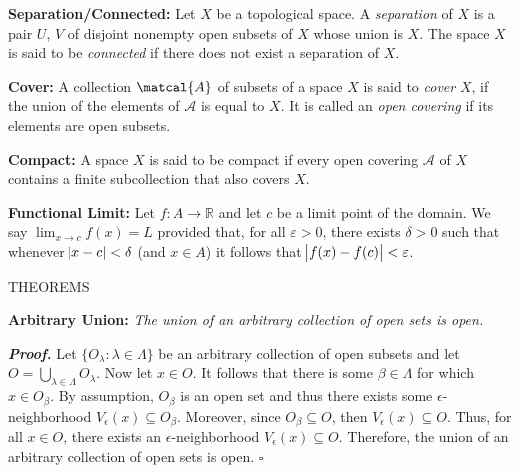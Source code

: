\documentclass[12pt, a4paper]{article}
\begin{document}
\vspace{4mm}\par

\textbf{Separation/Connected:} Let $X$ be a topological space. A \textit{separation} of $X$ is a pair $U$, $V$ of disjoint nonempty open subsets of $X$ whose union is $X$. The space $X$ is said to be \textit{connected} if there does not exist a separation of $X$.

\vspace{4mm}\par

\textbf{Cover:} A collection $\matcal{A}$ of subsets of a space $X$ is said to \textit{cover} $X$, if the union of the elements of $\mathcal{A}$ is equal to $X$. It is called an \textit{open covering} if its elements are open subsets.

\vspace{4mm}\par

\textbf{Compact:} A space $X$ is said to be compact if every open covering $\mathcal{A}$ of $X$ contains a finite subcollection that also covers $X$.

\vspace{4mm}\par

\textbf{Functional Limit:} Let $f\colon A\rightarrow\mathbb{R}$ and let $c$ be a limit point of the domain. We say $\lim_{x\rightarrow c}f(x)=L$ provided that, for all $\varepsilon>0$, there exists $\delta>0$ such that whenever $\abs{x-c}<\delta$ (and $x\in A$) it follows that $\abs{f(x)-f(c)}<\varepsilon$.

\vspace{4mm}

\newpage

\hline

\vspace{2mm}

\centerline{THEOREMS}

\vspace{2mm}

\hline

\vspace{4mm}\par

\textbf{Arbitrary Union:} \textit{The union of an arbitrary collection of open sets is open.}

\begin{description}
    \item\textit{\textbf{Proof.}} Let $\{O_{\lambda}\colon \lambda\in\Lambda\}$ be an arbitrary collection of open subsets and let $O=\bigcup_{\lambda\in\Lambda}O_{\lambda}$. Now let $x\in O$. It follows that there is some $\beta\in \Lambda$ for which $x\in O_{\beta}$. By assumption, $O_{\beta}$ is an open set and thus there exists some $\epsilon$-neighborhood $V_{\epsilon}(x)\subseteq O_{\beta}$. Moreover, since $O_{\beta}\subseteq O$, then $V_{\epsilon}(x)\subseteq O$. Thus, for all $x\in O$, there exists an $\epsilon$-neighborhood $V_{\epsilon}(x)\subseteq O$. Therefore, the union of an arbitrary collection of open sets is open. $\square$
\end{description}
\end{document}

